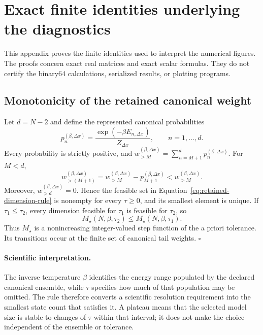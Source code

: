 \documentclass[11pt]{article}
\begin{document}
\section{Exact finite identities underlying the diagnostics}
\label{app:exact-identities}

This appendix proves the finite identities used to interpret the numerical figures.
The proofs concern exact real matrices and exact scalar formulas. They do not certify
the binary64 calculations, serialized results, or plotting programs.

\subsection{Monotonicity of the retained canonical weight}

Let $d=N-2$ and define the represented canonical probabilities
\begin{equation}
 p_n^{(\beta,\Delta x)}
 =\frac{\exp(-\beta E_{n,\Delta x})}{Z_{\Delta x}},
 \qquad n=1,\ldots,d.
\end{equation}
Every probability is strictly positive, and
$w_{>M}^{(\beta,\Delta x)}=\sum_{n=M+1}^{d}p_n^{(\beta,\Delta x)}$.
For $M<d$,
\begin{equation}
 w_{>(M+1)}^{(\beta,\Delta x)}
 =w_{>M}^{(\beta,\Delta x)}-p_{M+1}^{(\beta,\Delta x)}
 <w_{>M}^{(\beta,\Delta x)}.
 \label{eq:appendix-tail-recurrence}
\end{equation}
Moreover, $w_{>d}^{(\beta,\Delta x)}=0$. Hence the feasible set in
Equation~\eqref{eq:retained-dimension-rule} is nonempty for every $\tau\geq0$, and its
smallest element is unique. If $\tau_1\leq\tau_2$, every dimension feasible for
$\tau_1$ is feasible for $\tau_2$, so
\begin{equation}
 M_{\star}(N,\beta,\tau_2)
 \leq M_{\star}(N,\beta,\tau_1).
\end{equation}
Thus $M_{\star}$ is a nonincreasing integer-valued step function of the a priori
tolerance. Its transitions occur at the finite set of canonical tail weights.
\hfill$\square$

\paragraph{Scientific interpretation.}
The inverse temperature $\beta$ identifies the energy range populated by the declared
canonical ensemble, while $\tau$ specifies how much of that population may be omitted.
The rule therefore converts a scientific resolution requirement into the smallest
state count that satisfies it. A plateau means that the selected model size is stable
to changes of $\tau$ within that interval; it does not make the choice independent of
the ensemble or tolerance.
\end{document}
